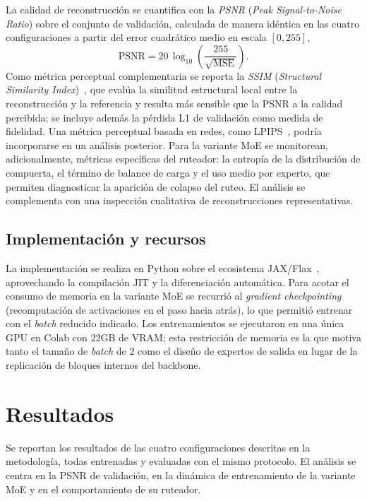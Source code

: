 \documentclass[aps,prl,twocolumn,groupedaddress]{revtex4-2}
\begin{document}
La calidad de reconstrucción se cuantifica con la \emph{PSNR} (\textit{Peak Signal-to-Noise Ratio}) sobre el conjunto de validación, calculada de manera idéntica en las cuatro configuraciones a partir del error cuadrático medio en escala $[0,255]$,
\begin{equation}
\mathrm{PSNR} = 20\,\log_{10}\!\left(\frac{255}{\sqrt{\mathrm{MSE}}}\right).
\end{equation}
Como métrica perceptual complementaria se reporta la \emph{SSIM} (\textit{Structural Similarity Index})~\cite{wang2004ssim}, que evalúa la similitud estructural local entre la reconstrucción y la referencia y resulta más sensible que la PSNR a la calidad percibida; se incluye además la pérdida L1 de validación como medida de fidelidad. Una métrica perceptual basada en redes, como LPIPS~\cite{zhang2018lpips}, podría incorporarse en un análisis posterior. Para la variante MoE se monitorean, adicionalmente, métricas específicas del ruteador: la entropía de la distribución de compuerta, el término de balance de carga y el uso medio por experto, que permiten diagnosticar la aparición de colapso del ruteo. El análisis se complementa con una inspección cualitativa de reconstrucciones representativas.

\subsection{Implementación y recursos}

La implementación se realiza en Python sobre el ecosistema JAX/Flax~\cite{jax2018,flax2023}, aprovechando la compilación JIT y la diferenciación automática. Para acotar el consumo de memoria en la variante MoE se recurrió al \textit{gradient checkpointing} (recomputación de activaciones en el paso hacia atrás), lo que permitió entrenar con el \textit{batch} reducido indicado. Los entrenamientos se ejecutaron en una única GPU en Colab con 22GB de VRAM; esta restricción de memoria es la que motiva tanto el tamaño de \textit{batch} de $2$ como el diseño de expertos de salida en lugar de la replicación de bloques internos del backbone.

\section{Resultados}

Se reportan los resultados de las cuatro configuraciones descritas en la metodología, todas entrenadas y evaluadas con el mismo protocolo. El análisis se centra en la PSNR de validación, en la dinámica de entrenamiento de la variante MoE y en el comportamiento de su ruteador.
\end{document}
